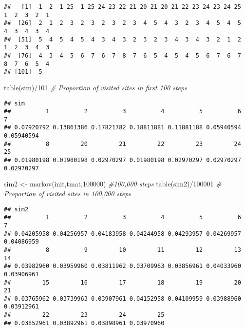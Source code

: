 \documentclass[
]{article}
\newenvironment{Shaded}{\begin{snugshade}}{\end{snugshade}}
\newcommand{\CommentTok}[1]{\textcolor[rgb]{0.56,0.35,0.01}{\textit{#1}}}
\newcommand{\DecValTok}[1]{\textcolor[rgb]{0.00,0.00,0.81}{#1}}
\newcommand{\FunctionTok}[1]{\textcolor[rgb]{0.00,0.00,0.00}{#1}}
\newcommand{\NormalTok}[1]{#1}
\newcommand{\OtherTok}[1]{\textcolor[rgb]{0.56,0.35,0.01}{#1}}
\newcommand{\SpecialCharTok}[1]{\textcolor[rgb]{0.00,0.00,0.00}{#1}}
\begin{document}
\begin{verbatim}
##   [1]  1  2  1 25  1 25 24 23 22 21 20 21 20 21 22 23 24 23 24 25  1  2  3  2  1
##  [26]  2  1  2  3  2  3  2  3  2  3  4  5  4  3  2  3  4  5  4  5  4  3  4  3  4
##  [51]  5  4  5  4  5  4  3  4  3  2  3  2  3  4  3  4  3  2  1  2  1  2  3  4  3
##  [76]  4  3  4  5  6  7  6  7  8  7  6  5  4  5  4  5  6  7  6  7  8  7  6  5  4
## [101]  5
\end{verbatim}

\begin{Shaded}
\begin{Highlighting}[]
\FunctionTok{table}\NormalTok{(sim)}\SpecialCharTok{/}\DecValTok{101} \CommentTok{\# Proportion of visited sites in first 100 steps}
\end{Highlighting}
\end{Shaded}

\begin{verbatim}
## sim
##          1          2          3          4          5          6          7 
## 0.07920792 0.13861386 0.17821782 0.18811881 0.11881188 0.05940594 0.05940594 
##          8         20         21         22         23         24         25 
## 0.01980198 0.01980198 0.02970297 0.01980198 0.02970297 0.02970297 0.02970297
\end{verbatim}

\begin{Shaded}
\begin{Highlighting}[]
\NormalTok{sim2 }\OtherTok{\textless{}{-}} \FunctionTok{markov}\NormalTok{(init,tmat,}\DecValTok{100000}\NormalTok{) }\CommentTok{\#100,000 steps}
\FunctionTok{table}\NormalTok{(sim2)}\SpecialCharTok{/}\DecValTok{100001} \CommentTok{\# Proportion of visited sites in 100,000 steps}
\end{Highlighting}
\end{Shaded}

\begin{verbatim}
## sim2
##          1          2          3          4          5          6          7 
## 0.04205958 0.04256957 0.04183958 0.04244958 0.04293957 0.04269957 0.04086959 
##          8          9         10         11         12         13         14 
## 0.03982960 0.03959960 0.03811962 0.03709963 0.03856961 0.04033960 0.03906961 
##         15         16         17         18         19         20         21 
## 0.03765962 0.03739963 0.03907961 0.04152958 0.04109959 0.03988960 0.03912961 
##         22         23         24         25 
## 0.03852961 0.03892961 0.03898961 0.03970960
\end{verbatim}
\end{document}
